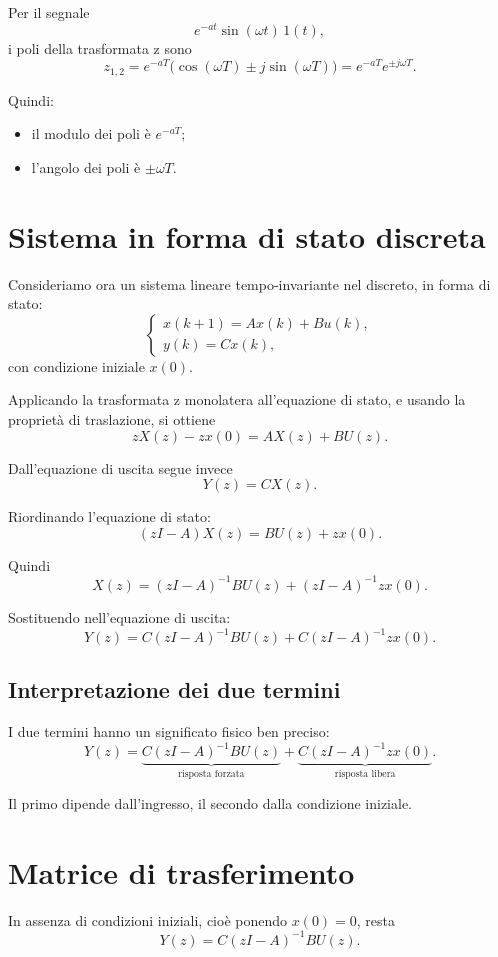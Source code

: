 Per il segnale
\[
e^{-at}\sin(\omega t)\,1(t),
\]
i poli della trasformata z sono
\[
z_{1,2}=e^{-aT}\bigl(\cos(\omega T)\pm j\sin(\omega T)\bigr)
=
e^{-aT}e^{\pm j\omega T}.
\]

Quindi:
\begin{itemize}
    \item il modulo dei poli \`e \(e^{-aT}\);
    \item l'angolo dei poli \`e \(\pm \omega T\).
\end{itemize}

\section{Sistema in forma di stato discreta}

Consideriamo ora un sistema lineare tempo-invariante nel discreto, in forma di stato:
\[
\begin{cases}
x(k+1)=Ax(k)+Bu(k),\\[4pt]
y(k)=Cx(k),
\end{cases}
\]
con condizione iniziale \(x(0)\).

Applicando la trasformata z monolatera all'equazione di stato, e usando la propriet\`a
di traslazione, si ottiene
\[
zX(z)-zx(0)=AX(z)+BU(z).
\]

Dall'equazione di uscita segue invece
\[
Y(z)=CX(z).
\]

Riordinando l'equazione di stato:
\[
(zI-A)X(z)=BU(z)+zx(0).
\]

Quindi
\[
X(z)=(zI-A)^{-1}BU(z)+(zI-A)^{-1}zx(0).
\]

Sostituendo nell'equazione di uscita:
\[
Y(z)=C(zI-A)^{-1}BU(z)+C(zI-A)^{-1}zx(0).
\]

\subsection{Interpretazione dei due termini}

I due termini hanno un significato fisico ben preciso:
\[
Y(z)=
\underbrace{C(zI-A)^{-1}BU(z)}_{\text{risposta forzata}}
+
\underbrace{C(zI-A)^{-1}zx(0)}_{\text{risposta libera}}.
\]

Il primo dipende dall'ingresso, il secondo dalla condizione iniziale.

\section{Matrice di trasferimento}

In assenza di condizioni iniziali, cio\`e ponendo \(x(0)=0\), resta
\[
Y(z)=C(zI-A)^{-1}BU(z).
\]

